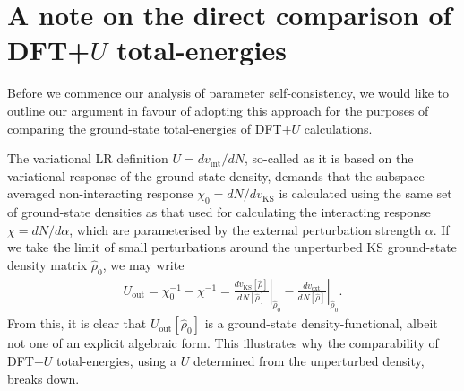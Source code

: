 \section[{A note on the direct comparison of DFT+$U$ total-energies}]{A note on the direct comparison of \break DFT+$U$ total-energies}

Before we commence our analysis  
of parameter self-consistency, 
we would like to outline our 
argument in favour of adopting this approach 
for the purposes of comparing the ground-state 
total-energies of DFT+$U$ calculations.
%

The variational LR definition
$U = d v_\textrm{int} / d N$, 
so-called as it is based on the 
variational response of the  ground-state density, 
demands that the subspace-averaged 
non-interacting response 
$\chi_0 = d N / d v_\textrm{KS} $ is calculated
using the same set of ground-state densities 
as that used for calculating 
the interacting response $\chi = d N / d \alpha$, 
which are parameterised by the external perturbation strength $\alpha$.
%
If we take the limit of 
small perturbations around the 
unperturbed KS ground-state density matrix $\hat{\rho}_0 $, 
we may write  
\begin{align}
U_\textrm{out}  = \chi_0^{-1} - \chi^{-1}
= \left. \frac{d v_\textrm{KS} \left[ \hat{\rho } \right] }{d N \left[ \hat{\rho } \right] } \right|_{\hat{\rho}_0} 
-
\left. \frac{d v_\textrm{ext}}{d N \left[ \hat{\rho } \right] } \right|_{\hat{\rho}_0}.
\end{align}
%
From this, it is clear that 
$U_\textrm{out} \left[ \hat{\rho}_0 \right] $ 
is a ground-state density-functional, 
albeit not one of an explicit algebraic form.
% 
This illustrates why the comparability of DFT+$U$ total-energies, 
using a $U$ determined from the unperturbed density, breaks down.
%

